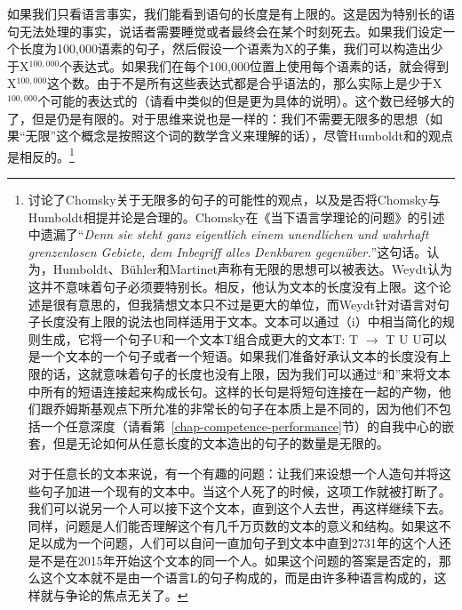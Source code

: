 \addlines
\noindent
如果我们只看语言事实，我们能看到语句的长度是有上限的。这是因为特别长的语句无法处理的事实，说话者需要睡觉或者最终会在某个时刻死去。如果我们设定一个长度为100,000语素的句子，然后假设一个语素为X的子集，我们可以构造出少于X$^{100,000}$个表达式。如果我们在每个100,000位置上使用每个语素的话，就会得到 X$^{100,000}$这个数。由于不是所有这些表达式都是合乎语法的，那么实际上是少于X$^{100,000}$个可能的表达式的（请看\citealp{Weydt72a}中类似的但是更为具体的说明）。这个数已经够大的了，但是仍是有限的。对于思维来说也是一样的：我们不需要无限多的思想（如果“无限”这个概念是按照这个词的数学含义来理解的话），尽管Humboldt和\citet[]{Chomsky2008a}的观点是相反的。\footnote{
\citet{Weydt72a}讨论了Chomsky关于无限多的句子的可能性的观点，以及是否将Chomsky与Humboldt相提并论是合理的。Chomsky在《当下语言学理论的问题》\citep[]{Chomsky70b-ut}的引述中遗漏了“\emph{Denn sie steht ganz eigentlich einem unendlichen und
    wahrhaft grenzenlosen Gebiete, dem Inbegriff alles Denkbaren gegenüber.}”这句话。\citet[]{Weydt72a}认为，Humboldt、Bühler和Martinet声称有无限的思想可以被表达。Weydt认为这并不意味着句子必须要特别长。相反，他认为文本的长度没有上限。这个论述是很有意思的，但我猜想文本只不过是更大的单位，而Weydt针对语言对句子长度没有上限的说法也同样适用于文本。文本可以通过（i）中相当简化的规则生成，它将一个句子U和一个文本T组合成更大的文本T:
  \ea
  T $\to$ T U
  \z
U可以是一个文本的一个句子或者一个短语。如果我们准备好承认文本的长度没有上限的话，这就意味着句子的长度也没有上限，因为我们可以通过“和”来将文本中所有的短语连接起来构成长句。这样的长句是将短句连接在一起的产物，他们跟乔姆斯基观点下所允准的非常长的句子在本质上是不同的，因为他们不包括一个任意深度（请看第~\ref{chap-competence-performance}节）的自我中心的嵌套，但是无论如何从任意长度的文本造出的句子的数量是无限的。

对于任意长的文本来说，有一个有趣的问题：让我们来设想一个人造句并将这些句子加进一个现有的文本中。当这个人死了的时候，这项工作就被打断了。我们可以说另一个人可以接下这个文本，直到这个人去世，再这样继续下去。同样，问题是人们能否理解这个有几千万页数的文本的意义和结构。如果这不足以成为一个问题，人们可以自问一直加句子到文本中直到2731年的这个人还是不是在2015年开始这个文本的同一个人。如果这个问题的答案是否定的，那么这个文本就不是由一个语言L的句子构成的，而是由许多种语言构成的，这样就与争论的焦点无关了。
} 
